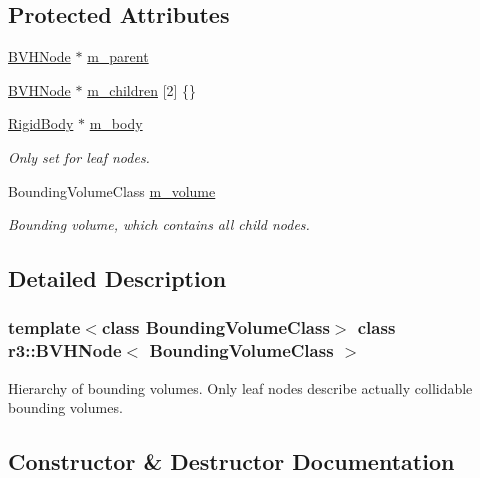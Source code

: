 \subsection*{Protected Attributes}
\begin{DoxyCompactItemize}
\item 
\mbox{\hyperlink{classr3_1_1_b_v_h_node}{B\+V\+H\+Node}} $\ast$ \mbox{\hyperlink{classr3_1_1_b_v_h_node_a62424473dd79cf59262a6a53995b0e26}{m\+\_\+parent}}
\item 
\mbox{\hyperlink{classr3_1_1_b_v_h_node}{B\+V\+H\+Node}} $\ast$ \mbox{\hyperlink{classr3_1_1_b_v_h_node_ac3df92e9a175e4037a07801e1cca73db}{m\+\_\+children}} \mbox{[}2\mbox{]} \{\}
\item 
\mbox{\hyperlink{classr3_1_1_rigid_body}{Rigid\+Body}} $\ast$ \mbox{\hyperlink{classr3_1_1_b_v_h_node_a7f1a7f51f17ed00cc39298ff4d1f1d57}{m\+\_\+body}}
\begin{DoxyCompactList}\small\item\em Only set for leaf nodes. \end{DoxyCompactList}\item 
Bounding\+Volume\+Class \mbox{\hyperlink{classr3_1_1_b_v_h_node_a114366b1f5cbb56f6f650f9c794258a7}{m\+\_\+volume}}
\begin{DoxyCompactList}\small\item\em Bounding volume, which contains all child nodes. \end{DoxyCompactList}\end{DoxyCompactItemize}


\subsection{Detailed Description}
\subsubsection*{template$<$class Bounding\+Volume\+Class$>$\newline
class r3\+::\+B\+V\+H\+Node$<$ Bounding\+Volume\+Class $>$}

Hierarchy of bounding volumes. Only leaf nodes describe actually collidable bounding volumes. 

\subsection{Constructor \& Destructor Documentation}
\mbox{\label{classr3_1_1_b_v_h_node_a31b8beb2d10f5df915be92eab4bdd7f6}} 
